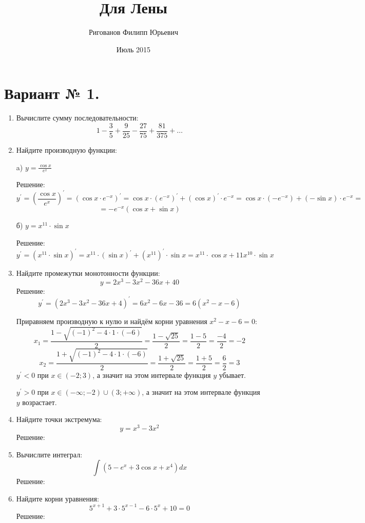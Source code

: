 \documentclass{article}
\title{Для Лены}
\author{Ригованов Филипп Юрьевич}
\date{Июль 2015}
\begin{document}
\maketitle
\section*{Вариант № 1.}
\begin{enumerate}

\item %
Вычислите сумму последовательности:
$$1-\frac{3}{5}+\frac{9}{25}-\frac{27}{75}+\frac{81}{375}+\ldots$$
\item %
Найдите производную функции:

a) $y=\frac{\cos{x}}{e^x}$

Решение:
$$y^\prime=\left(\frac{\cos{x}}{e^x}\right)^\prime=\left(\cos{x}\cdot e^{-x}\right)^\prime=\cos{x}\cdot\left(e^{-x}\right)^\prime+\left(\cos{x}\right)^\prime\cdot e^{-x}=\cos{x}\cdot\left(-e^{-x}\right)+\left(-\sin{x}\right)\cdot e^{-x}=$$ $$=-e^{-x}\left(\cos{x}+\sin{x}\right)$$

б) $y=x^{11}\cdot\sin{x}$

Решение:
$$y^\prime=\left(x^{11}\cdot\sin{x}\right)^\prime=x^{11}\cdot\left(\sin{x}\right)^\prime+\left(x^{11}\right)^\prime\cdot\sin{x}=x^{11}\cdot\cos{x}+11x^{10}\cdot\sin{x}$$

\item %
Найдите промежутки монотонности функции:
$$y=2x^3-3x^2-36x+40$$
Решение:
$$y^\prime=\left(2x^3-3x^2-36x+4\right)^\prime=6x^2-6x-36=6\left(x^2-x-6\right)$$ %

Приравняем производную к нулю и найдём корни уравнения $x^2-x-6=0$:
$$x_1=\frac{1-\sqrt{(-1)^2-4\cdot1\cdot(-6)}}{2}=\frac{1-\sqrt{25}}{2}=\frac{1-5}{2}=\frac{-4}{2}=-2$$
$$x_2=\frac{1+\sqrt{(-1)^2-4\cdot1\cdot(-6)}}{2}=\frac{1+\sqrt{25}}{2}=\frac{1+5}{2}=\frac{6}{2}=3$$
$y^\prime<0$ при $x\in\left(-2;3\right)$, а значит на этом интервале функция $y$ убывает.

$y^\prime>0$ при $x\in\left(-\infty;-2\right)\cup\left(3;+\infty\right)$, а значит на этом интервале функция $y$ возрастает.

\item %
Найдите точки экстремума:
$$y=x^3-3x^2$$
Решение:


\item %
Вычислите интеграл:
$$\int{\left(5-e^x+3\cos{x}+x^4\right)dx}$$
Решение:


\item %
Найдите корни уравнения:
$$5^{x+1}+3\cdot5^{x-1}-6\cdot5^x+10=0$$
Решение:



\end{enumerate}
\end{document}
